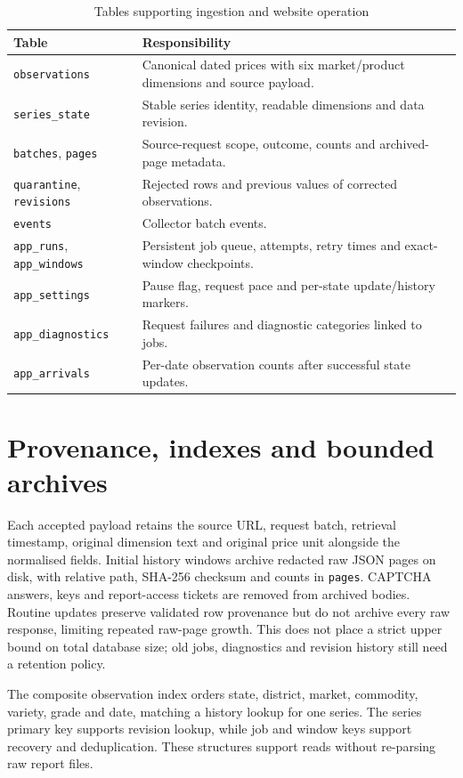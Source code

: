 \documentclass[12pt,a4paper,oneside]{report}
\numberwithin{equation}{chapter}
\numberwithin{figure}{chapter}
\numberwithin{table}{chapter}
\theoremstyle{definition}
\begin{document}
\begin{table}[H]
\centering
\caption{Tables supporting ingestion and website operation}
\label{tab:tables}
\small
\begin{tabular}{@{}p{}p{}@{}}
\toprule
Table & Responsibility \\
\midrule
\texttt{observations} & Canonical dated prices with six market/product dimensions and source payload. \\
\texttt{series\_state} & Stable series identity, readable dimensions and data revision. \\
\texttt{batches}, \texttt{pages} & Source-request scope, outcome, counts and archived-page metadata. \\
\texttt{quarantine}, \texttt{revisions} & Rejected rows and previous values of corrected observations. \\
\texttt{events} & Collector batch events. \\
\texttt{app\_runs}, \texttt{app\_windows} & Persistent job queue, attempts, retry times and exact-window checkpoints. \\
\texttt{app\_settings} & Pause flag, request pace and per-state update/history markers. \\
\texttt{app\_diagnostics} & Request failures and diagnostic categories linked to jobs. \\
\texttt{app\_arrivals} & Per-date observation counts after successful state updates. \\
\bottomrule
\end{tabular}
\end{table}

\section{Provenance, indexes and bounded archives}
Each accepted payload retains the source URL, request batch, retrieval timestamp, original dimension text and original price unit alongside the normalised fields. Initial history windows archive redacted raw JSON pages on disk, with relative path, SHA-256 checksum and counts in \texttt{pages}. CAPTCHA answers, keys and report-access tickets are removed from archived bodies. Routine updates preserve validated row provenance but do not archive every raw response, limiting repeated raw-page growth. This does not place a strict upper bound on total database size; old jobs, diagnostics and revision history still need a retention policy.

The composite observation index orders state, district, market, commodity, variety, grade and date, matching a history lookup for one series. The series primary key supports revision lookup, while job and window keys support recovery and deduplication. These structures support reads without re-parsing raw report files.
\end{document}
